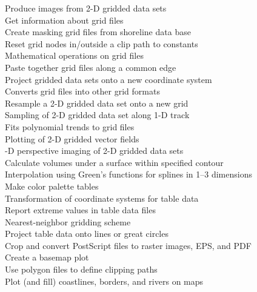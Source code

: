 \begin{tabbing}
	\>	Produce images from 2-D gridded data sets \\ 
	\>	Get information about grid files \\ 
	\>	Create masking grid files from shoreline data base \\ 
	\>	Reset grid nodes in/outside a clip path to constants \\ 
	\>	Mathematical operations on grid files \\ 
	\>	Paste together grid files along a common edge \\ 
	\>	Project gridded data sets onto a new coordinate system \\ 
	\>	Converts grid files into other grid formats \\ 
	\>	Resample a 2-D gridded data set onto a new grid \\ 
	\>	Sampling of 2-D gridded data set along 1-D track \\ 
	\>	Fits polynomial trends to grid files \\ 
	\>	Plotting of 2-D gridded vector fields \\ 
	-D perspective imaging of 2-D gridded data sets \\ 
	\>	Calculate volumes under a surface within specified contour \\ 
	\>	Interpolation using Green's functions for splines in 1--3 dimensions \\ 
	\>	Make color palette tables \\ 
	\>	Transformation of coordinate systems for table data \\ 
	\>	Report extreme values in table data files \\ 
	\>	Nearest-neighbor gridding scheme \\ 
	\>	Project table data onto lines or great circles \\ 
	\>	Crop and convert PostScript files to raster images, EPS, and PDF \\
	\>	Create a basemap plot \\ 
	\>	Use polygon files to define clipping paths \\ 
	\>	Plot (and fill) coastlines, borders, and rivers on maps \\ 

\end{tabbing}
